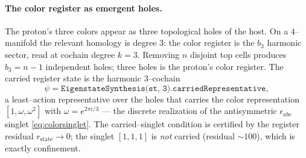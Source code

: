 \documentclass[11pt,oneside]{article}
\begin{document}
\paragraph{The color register as emergent holes.}
The proton's three colors appear as three topological holes of the host. On a
$4$--manifold the relevant homology is degree $3$: the color register is the
$b_3$ harmonic sector, read at cochain degree $k=3$. Removing $n$ disjoint top
cells produces $b_3 = n-1$ independent holes; three holes is the proton's color
register. The carried register state is the harmonic $3$--cochain
\begin{equation}
  \psi = \texttt{EigenstateSynthesis(st, 3).carriedRepresentative},
\end{equation}
a least--action representative over the holes that carries the color
representation $[1,\omega,\omega^2]$ with $\omega=e^{2\pi i/3}$ --- the discrete
realization of the antisymmetric $\epsilon_{abc}$ singlet
\eqref{eq:colorsinglet}. The carried--singlet condition is certified by the
register residual $r_{\text{state}}\to0$; the singlet $[1,1,1]$ is \emph{not}
carried (residual $\sim 100$), which is exactly confinement.
\end{document}
